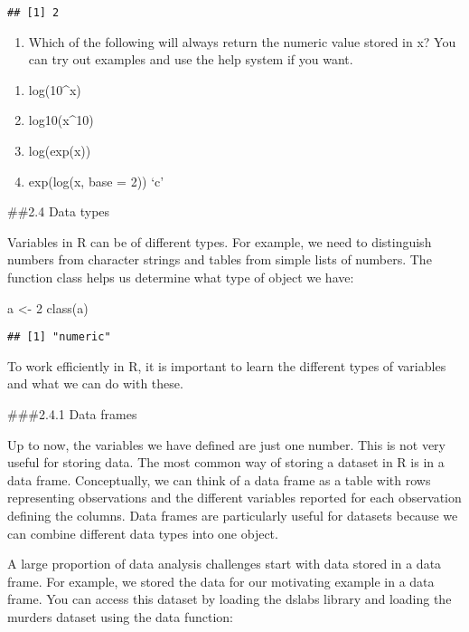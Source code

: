\documentclass[
]{article}
\newenvironment{Shaded}{\begin{snugshade}}{\end{snugshade}}
\newcommand{\DecValTok}[1]{\textcolor[rgb]{0.00,0.00,0.81}{#1}}
\newcommand{\FunctionTok}[1]{\textcolor[rgb]{0.00,0.00,0.00}{#1}}
\newcommand{\NormalTok}[1]{#1}
\newcommand{\OtherTok}[1]{\textcolor[rgb]{0.56,0.35,0.01}{#1}}
\providecommand{\tightlist}{%
  \setlength{\itemsep}{0pt}\setlength{\parskip}{0pt}}
\begin{document}
\begin{verbatim}
## [1] 2
\end{verbatim}

\begin{enumerate}
\def\labelenumi{\arabic{enumi}.}
\setcounter{enumi}{4}
\tightlist
\item
  Which of the following will always return the numeric value stored in
  x? You can try out examples and use the help system if you want.
\end{enumerate}

\begin{enumerate}
\def\labelenumi{\alph{enumi}.}
\tightlist
\item
  log(10\^{}x)
\item
  log10(x\^{}10)
\item
  log(exp(x))
\item
  exp(log(x, base = 2)) `c'
\end{enumerate}

\#\#2.4 Data types

Variables in R can be of different types. For example, we need to
distinguish numbers from character strings and tables from simple lists
of numbers. The function class helps us determine what type of object we
have:

\begin{Shaded}
\begin{Highlighting}[]
\NormalTok{a }\OtherTok{\textless{}{-}} \DecValTok{2}
\FunctionTok{class}\NormalTok{(a)}
\end{Highlighting}
\end{Shaded}

\begin{verbatim}
## [1] "numeric"
\end{verbatim}

To work efficiently in R, it is important to learn the different types
of variables and what we can do with these.

\#\#\#2.4.1 Data frames

Up to now, the variables we have defined are just one number. This is
not very useful for storing data. The most common way of storing a
dataset in R is in a data frame. Conceptually, we can think of a data
frame as a table with rows representing observations and the different
variables reported for each observation defining the columns. Data
frames are particularly useful for datasets because we can combine
different data types into one object.

A large proportion of data analysis challenges start with data stored in
a data frame. For example, we stored the data for our motivating example
in a data frame. You can access this dataset by loading the dslabs
library and loading the murders dataset using the data function:
\end{document}
